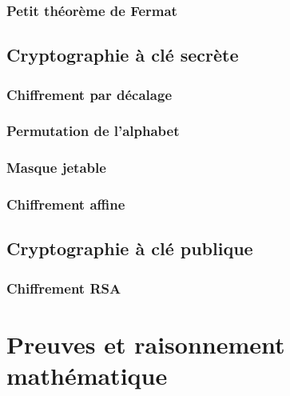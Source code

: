 \documentclass[
  letterpaper,
]{scrbook}
\theoremstyle{definition}
\theoremstyle{definition}
\theoremstyle{plain}
\theoremstyle{remark}
\begin{document}
\hypertarget{petit-thuxe9oruxe8me-de-fermat}{%
\subsection{Petit théorème de
Fermat}\label{petit-thuxe9oruxe8me-de-fermat}}

\hypertarget{cryptographie-uxe0-cluxe9-secruxe8te}{%
\section{Cryptographie à clé
secrète}\label{cryptographie-uxe0-cluxe9-secruxe8te}}

\hypertarget{chiffrement-par-duxe9calage}{%
\subsection{Chiffrement par
décalage}\label{chiffrement-par-duxe9calage}}

\hypertarget{permutation-de-lalphabet}{%
\subsection{Permutation de l'alphabet}\label{permutation-de-lalphabet}}

\hypertarget{masque-jetable}{%
\subsection{Masque jetable}\label{masque-jetable}}

\hypertarget{chiffrement-affine}{%
\subsection{Chiffrement affine}\label{chiffrement-affine}}

\hypertarget{cryptographie-uxe0-cluxe9-publique}{%
\section{Cryptographie à clé
publique}\label{cryptographie-uxe0-cluxe9-publique}}

\hypertarget{chiffrement-rsa}{%
\subsection{Chiffrement RSA}\label{chiffrement-rsa}}


\hypertarget{preuves-et-raisonnement-mathuxe9matique}{%
\chapter{Preuves et raisonnement
mathématique}\label{preuves-et-raisonnement-mathuxe9matique}}
\end{document}
